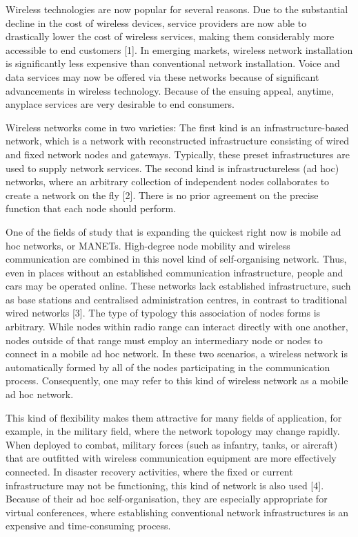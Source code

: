 \documentclass{default}
\begin{document}
Wireless technologies are now popular for several reasons. Due to the substantial decline in the cost of wireless devices, service providers are now able to drastically lower the cost of wireless services, making them considerably more accessible to end customers [1]. In emerging markets, wireless network installation is significantly less expensive than conventional network installation. Voice and data services may now be offered via these networks because of significant advancements in wireless technology. Because of the ensuing appeal, anytime, anyplace services are very desirable to end consumers.

Wireless networks come in two varieties: The first kind is an infrastructure-based network, which is a network with reconstructed infrastructure consisting of wired and fixed network nodes and gateways. Typically, these preset infrastructures are used to supply network services. The second kind is infrastructureless (ad hoc) networks, where an arbitrary collection of independent nodes collaborates to create a network on the fly [2]. There is no prior agreement on the precise function that each node should perform.

One of the fields of study that is expanding the quickest right now is mobile ad hoc networks, or MANETs. High-degree node mobility and wireless communication are combined in this novel kind of self-organising network. Thus, even in places without an established communication infrastructure, people and cars may be operated online. These networks lack established infrastructure, such as base stations and centralised administration centres, in contrast to traditional wired networks [3]. The type of typology this association of nodes forms is arbitrary. While nodes within radio range can interact directly with one another, nodes outside of that range must employ an intermediary node or nodes to connect in a mobile ad hoc network. In these two scenarios, a wireless network is automatically formed by all of the nodes participating in the communication process. Consequently, one may refer to this kind of wireless network as a mobile ad hoc network.

This kind of flexibility makes them attractive for many fields of application, for example, in the military field, where the network topology may change rapidly. When deployed to combat, military forces (such as infantry, tanks, or aircraft) that are outfitted with wireless communication equipment are more effectively connected. In disaster recovery activities, where the fixed or current infrastructure may not be functioning, this kind of network is also used [4]. Because of their ad hoc self-organisation, they are especially appropriate for virtual conferences, where establishing conventional network infrastructures is an expensive and time-consuming process.
\end{document}
